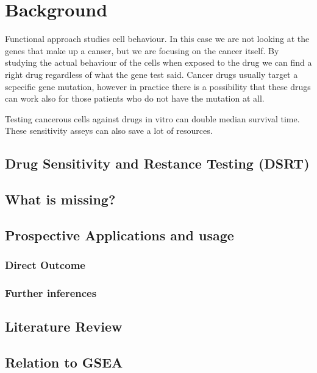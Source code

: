 \chapter{Background}
\label{chapter:background} 

Functional approach studies cell behaviour. In this case we are not looking at the genes that make up a canser, but we are focusing on the cancer itself. By studying the actual behaviour of the cells when exposed to the drug we can find a right drug regardless of what the gene test said. Cancer drugs usually target a scpecific gene mutation, however in practice there is a possibility that these drugs can work also for those patients who do not have the mutation at all.

Testing cancerous cells against drugs in vitro can double median survival time. These sensitivity asseys can also save a lot of resources.

\section{Drug Sensitivity and Restance Testing (DSRT)}

\section{What is missing?}

\section{Prospective Applications and usage}
\subsection{Direct Outcome}
\subsection{Further inferences}

\section{Literature Review}
\section{Relation to GSEA}
